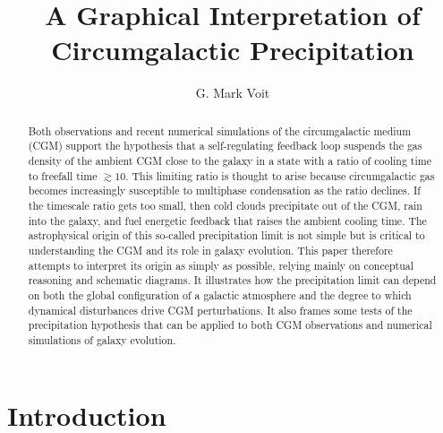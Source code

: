 \documentclass[twocolumn]{aastex63}
\begin{document}
\title{A Graphical Interpretation of Circumgalactic Precipitation}


\author[0000-0002-3514-0383]{G. Mark Voit}



\begin{abstract}
Both observations and recent numerical simulations of the circumgalactic medium (CGM) support the hypothesis that a self-regulating feedback loop suspends the gas density of the ambient CGM close to the galaxy in a state with a ratio of cooling time to freefall time $\gtrsim 10$.  This limiting ratio is thought to arise because circumgalactic gas becomes increasingly susceptible to multiphase condensation as the ratio declines.  If the timescale ratio gets too small, then cold clouds precipitate out of the CGM, rain into the galaxy, and fuel energetic feedback that raises the ambient cooling time.  The astrophysical origin of this so-called precipitation limit is not simple but is critical to understanding the CGM and its role in galaxy evolution.  This paper therefore attempts to interpret its origin as simply as possible, relying mainly on conceptual reasoning and schematic diagrams.  It illustrates how the precipitation limit can depend on both the global configuration of a galactic atmosphere and the degree to which dynamical disturbances drive CGM perturbations.  It also frames some tests of the precipitation hypothesis that can be applied to both CGM observations and numerical simulations of galaxy evolution.
\end{abstract}



\section{Introduction} 
\label{sec:intro}
 
\end{document}
